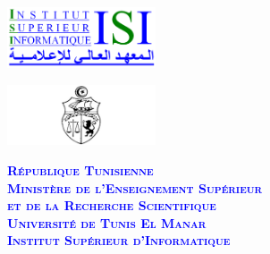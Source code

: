 \documentclass{article}
\begin{document}
\pagestyle{fancy}
\renewcommand{\footrulewidth}{0.4pt}
\renewcommand{\headrulewidth}{0.0pt}
\renewcommand{\baselinestretch}{1}
\lhead{}
\rhead{}


\begin{center}
\begin{minipage}[c]{58mm}
\begin{center}
\includegraphics[width=44mm]{LogoISI}
\end{center}
\end{minipage}
\begin{minipage}[c]{58mm}
\begin{center}
\includegraphics[width=44mm]{Tn2}
\end{center}
\end{minipage}
\begin{minipage}[c]{58mm}
\begin{center}
\textcolor{blue}{
	\footnotesize{
			\textbf{ 
			\textsc{République Tunisienne\\
			Ministère de l'Enseignement Supérieur\\
			et de la Recherche Scientifique\\
			Université de Tunis El Manar\\
			Institut Supérieur d'Informatique\\
			}
		}
	}
}
\end{center}
\end{minipage}
\end{center}
\end{document}
